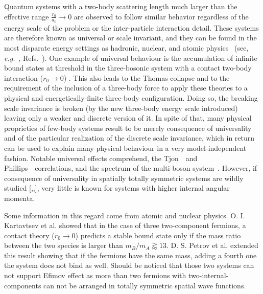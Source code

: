 \documentclass[preprint,12pt]{elsarticle}
\newcommand{\eg}{\textit{e.g.}~}
\begin{document}
Quantum systems with a two-body scattering length much larger than the effective range $\frac{r_0}{a_0}\rightarrow 0$ are observed to follow similar behavior regardless of the energy scale of the problem or the inter-particle interaction detail.
These systems are therefore known as universal or scale invariant, and they can be found in the most disparate energy settings as hadronic, nuclear, and atomic physics ~(see, \eg,
Refs.~\cite{Tornqvist:1991ks,Voloshin:2003nt,Braaten:2003he,philli,tjon,PhysRevLett.81.69}).
One example of universal behaviour is the accumulation of infinite bound states at threshold in the three-bosonic system with a contact two-body interaction ($r_0\rightarrow0$) \cite{Efimov:1971zz}.
This also leads to the Thomas collapse \cite{PhysRev.47.903} and to the requirement of the inclusion of a three-body force to apply these theories to a physical and energetically-finite three-body configuration.
Doing so, the breaking scale invariance is broken (by the new three-body energy scale introduced) leaving only a weaker and discrete version of it.
In spite of that, many physical proprieties of few-body systems result to be merely consequence of universality and of the particular realization of the discrete scale invariance, which in return can be used to explain many physical behaviour in a very model-independent fashion.
Notable universal effects comprehend, the Tjon~\cite{tjon}~and Phillips~\cite{philli}~correlations, and the spectrum of the multi-boson system~\cite{manybosons}.
However, if consequence of universality in spatially totally symmetric systems are wildly studied [,,], very little is known for systems with higher internal angular momenta. 

Some information in this regard come from atomic and nuclear physics. 
O. I. Kartavtsev et al.  \cite{Kartavtsev_2007} showed that in the case of three two-component fermions, a contact theory ($r_0\rightarrow 0$) predicts a stable bound state only if the mass ratio between the two species is larger than $m_B/m_A \gtrapprox 13 $.
D. S. Petrov et al. \cite{petrov_dimerov, Petrov:2005zz,PhysRevA.92.053624} extended this result showing that if the fermions have the same mass, adding a fourth one the system does not bind as well.
Should be noticed that those two systems can not support Efimov effect as more than two fermions with two-internal-components can not be arranged in totally symmetric spatial wave functions.
\end{document}
